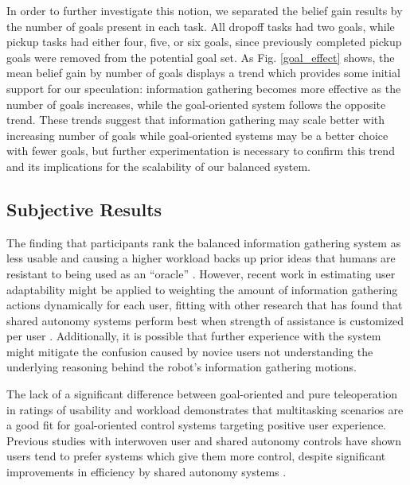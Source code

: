 \documentclass[conference]{IEEEtran}
\begin{document}
In order to further investigate this notion, we separated the belief gain results by the number of goals present in each task. All dropoff tasks had two goals, while pickup tasks had either four, five, or six goals, since previously completed pickup goals were removed from the potential goal set. As Fig. \ref{goal_effect} shows, the mean belief gain by number of goals displays a trend which provides some initial support for our speculation: information gathering becomes more effective as the number of goals increases, while the goal-oriented system follows the opposite trend. These trends suggest that information gathering may scale better with increasing number of goals while goal-oriented systems may be a better choice with fewer goals, but further experimentation is necessary to confirm this trend and its implications for the scalability of our balanced system.

\subsection{Subjective Results}

The finding that participants rank the balanced information gathering system as less usable and causing a higher workload backs up prior ideas that humans are resistant to being used as an ``oracle'' \cite{javdani2015shared}. However, recent work in estimating user adaptability \cite{nikolaidis2017human} might be applied to weighting the amount of information gathering actions dynamically for each user, fitting with other research that has found that shared autonomy systems perform best when strength of assistance is customized per user \cite{gopinath2017human}. Additionally, it is possible that further experience with the system might mitigate the confusion caused by novice users not understanding the underlying reasoning behind the robot's information gathering motions.

The lack of a significant difference between goal-oriented and pure teleoperation in ratings of usability and workload demonstrates that multitasking scenarios are a good fit for goal-oriented control systems targeting positive user experience. Previous studies with interwoven user and shared autonomy controls have shown users tend to prefer systems which give them more control, despite significant improvements in efficiency by shared autonomy systems \cite{javdani2015shared, javdani2018shared}.
\end{document}
